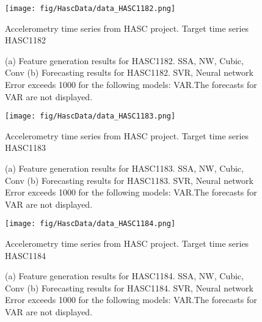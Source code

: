 \documentclass[12pt]{article}
\begin{document}
\begin{figure}
\centering
\texttt{[image: fig/HascData/data\_HASC1182.png]}
\caption{Accelerometry time series from HASC project. Target time series	HASC1182	}
\end{figure}


\begin{figure}
\centering
{}
\caption{(a)	Feature generation results for	HASC1182.	SSA, NW, Cubic, Conv	(b)	Forecasting results for	HASC1182.	SVR, Neural network	Error exceeds 1000 for the following models: VAR.The forecasts for VAR are not displayed.	}
\end{figure}


\begin{figure}
\centering
\texttt{[image: fig/HascData/data\_HASC1183.png]}
\caption{Accelerometry time series from HASC project. Target time series	HASC1183	}
\end{figure}


\begin{figure}
\centering
{}
\caption{(a)	Feature generation results for	HASC1183.	SSA, NW, Cubic, Conv	(b)	Forecasting results for	HASC1183.	SVR, Neural network	Error exceeds 1000 for the following models: VAR.The forecasts for VAR are not displayed.	}
\end{figure}


\begin{figure}
\centering
\texttt{[image: fig/HascData/data\_HASC1184.png]}
\caption{Accelerometry time series from HASC project. Target time series	HASC1184	}
\end{figure}


\begin{figure}
\centering
{}
\caption{(a)	Feature generation results for	HASC1184.	SSA, NW, Cubic, Conv	(b)	Forecasting results for	HASC1184.	SVR, Neural network	Error exceeds 1000 for the following models: VAR.The forecasts for VAR are not displayed.	}
\end{figure}
\end{document}
